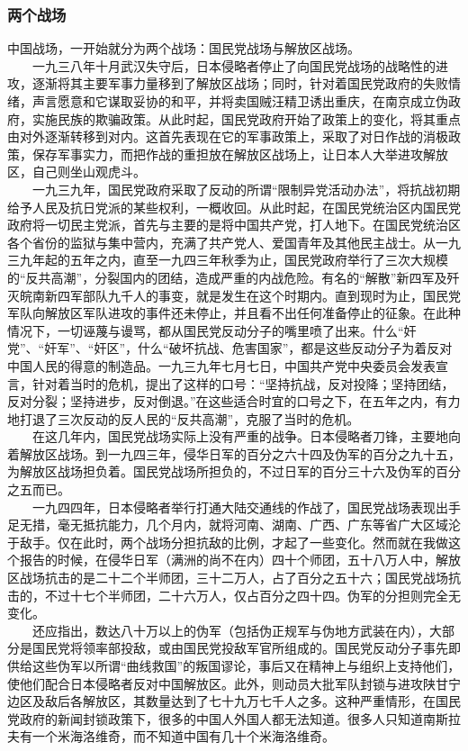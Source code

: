 \documentclass[cn,11pt,chinese]{elegantbook}
\def\myformat#1{\hfil\hfil #1}
\begin{document}
\subsubsection*{\myformat{两个战场}}
中国战场，一开始就分为两个战场：国民党战场与解放区战场。\\
　　一九三八年十月武汉失守后，日本侵略者停止了向国民党战场的战略性的进攻，逐渐将其主要军事力量移到了解放区战场；同时，针对着国民党政府的失败情绪，声言愿意和它谋取妥协的和平，并将卖国贼汪精卫诱出重庆，在南京成立伪政府，实施民族的欺骗政策。从此时起，国民党政府开始了政策上的变化，将其重点由对外逐渐转移到对内。这首先表现在它的军事政策上，采取了对日作战的消极政策，保存军事实力，而把作战的重担放在解放区战场上，让日本人大举进攻解放区，自己则坐山观虎斗。\\
　　一九三九年，国民党政府采取了反动的所谓“限制异党活动办法”，将抗战初期给予人民及抗日党派的某些权利，一概收回。从此时起，在国民党统治区内国民党政府将一切民主党派，首先与主要的是将中国共产党，打人地下。在国民党统治区各个省份的监狱与集中营内，充满了共产党人、爱国青年及其他民主战士。从一九三九年起的五年之内，直至一九四三年秋季为止，国民党政府举行了三次大规模的“反共高潮”，分裂国内的团结，造成严重的内战危险。有名的“解散”新四军及歼灭皖南新四军部队九千人的事变，就是发生在这个时期内。直到现时为止，国民党军队向解放区军队进攻的事件还未停止，并且看不出任何准备停止的征象。在此种情况下，一切诬蔑与谩骂，都从国民党反动分子的嘴里喷了出来。什么“奸党”、“奸军”、“奸区”，什么“破坏抗战、危害国家”，都是这些反动分子为着反对中国人民的得意的制造品。一九三九年七月七日，中国共产党中央委员会发表宣言，针对着当时的危机，提出了这样的口号：“坚持抗战，反对投降；坚持团结，反对分裂；坚持进步，反对倒退。”在这些适合时宜的口号之下，在五年之内，有力地打退了三次反动的反人民的“反共高潮”，克服了当时的危机。\\
　　在这几年内，国民党战场实际上没有严重的战争。日本侵略者刀锋，主要地向着解放区战场。到一九四三年，侵华日军的百分之六十四及伪军的百分之九十五，为解放区战场担负着。国民党战场所担负的，不过日军的百分三十六及伪军的百分之五而已。\\
　　一九四四年，日本侵略者举行打通大陆交通线的作战了，国民党战场表现出手足无措，毫无抵抗能力，几个月内，就将河南、湖南、广西、广东等省广大区域沦于敌手。仅在此时，两个战场分担抗敌的比例，才起了一些变化。然而就在我做这个报告的时候，在侵华日军（满洲的尚不在内）四十个师团，五十八万人中，解放区战场抗击的是二十二个半师团，三十二万人，占了百分之五十六；国民党战场抗击的，不过十七个半师团，二十六万人，仅占百分之四十四。伪军的分担则完全无变化。\\
　　还应指出，数达八十万以上的伪军（包括伪正规军与伪地方武装在内），大部分是国民党将领率部投敌，或由国民党投敌军官所组成的。国民党反动分子事先即供给这些伪军以所谓“曲线救国”的叛国谬论，事后又在精神上与组织上支持他们，使他们配合日本侵略者反对中国解放区。此外，则动员大批军队封锁与进攻陕甘宁边区及敌后各解放区，其数量达到了七十九万七千人之多。这种严重情形，在国民党政府的新闻封锁政策下，很多的中国人外国人都无法知道。很多人只知道南斯拉夫有一个米海洛维奇，而不知道中国有几十个米海洛维奇。\\
\end{document}
